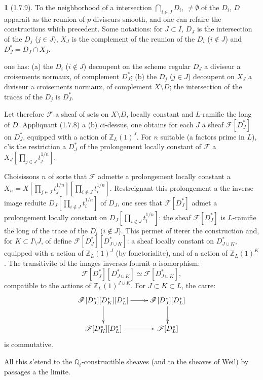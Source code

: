 \documentclass[12pt,a4paper]{article}
\theoremstyle{plain}
\theoremstyle{definition}
\theoremstyle{definition}
\newtheorem{para}{}[section]
\theoremstyle{remark}
\begin{document}
\begin{para}[1.7.9]
To the neighborhood of a intersection $\bigcap_{i \in J} D_i$, $\neq \emptyset$ of the $D_i$, $D$ apparait as the reunion of $p$ diviseurs smooth, and one can refaire the constructions which precedent. Some notations: for $J \subset I$, $D_J$ is the intersection of the $D_j$ ($j \in J$), $X_J$ is the complement of the reunion of the $D_i$ ($i \notin J$) and $D_J^* = D_J \cap X_J$.

one has: (a) the $D_i$ ($i \notin J$) decoupent on the scheme regular $D_J$ a diviseur a croisements normaux, of complement $D_J^*$; (b) the $D_j$ ($j \in J$) decoupent on $X_J$ a diviseur a croisements normaux, of complement $X \setminus D$; the intersection of the traces of the $D_j$ is $D_J^*$.

Let therefore $\mathscr{F}$ a sheaf of sets on $X \setminus D$, locally constant and $L$-ramifie the long of $D$. Appliquant (1.7.8) a (b) ci-dessus, one obtains for each $J$ a sheaf $\mathscr{F}[D_J^*]$ on $D_J^*$, equipped with a action of $\mathbb{Z}_L(1)^J$. For $n$ suitable (a factors prime in $L$), c'is the restriction a $D_J^*$ of the prolongement locally constant of $\mathscr{F}$ a $X_J[\prod_{j \in J} t_j^{1/n}]$.

Choisissons $n$ of sorte that $\mathscr{F}$ admette a prolongement locally constant a $X_n = X[\prod_{j \in J} t_j^{1/n}][\prod_{i \notin J} t_i^{1/n}]$. Restreignant this prolongement a the inverse image reduite $D_J[\prod_{i \notin J} t_i^{1/n}]$ of $D_J$, one sees that $\mathscr{F}[D_J^*]$ admet a prolongement locally constant on $D_J[\prod_{i \notin J} t_i^{1/n}]$: the sheaf $\mathscr{F}[D_J^*]$ is $L$-ramifie the long of the trace of the $D_i$ ($i \notin J$). This permet of iterer the construction and, for $K \subset I \setminus J$, of define $\mathscr{F}[D_J^*][D_{J \cup K}^*]$: a sheaf locally constant on $D_{J \cup K}^*$, equipped with a action of $\mathbb{Z}_L(1)^J$ (by fonctorialite), and of a action of $\mathbb{Z}_L(1)^K$. The transitivite of the images inverses fournit a isomorphism:
\begin{equation}\tag{1.7.9.1}
\mathscr{F}[D_J^*][D_{J \cup K}^*] \simeq \mathscr{F}[D_{J \cup K}^*],
\end{equation}
compatible to the actions of $\mathbb{Z}_L(1)^{J \cup K}$. For $J \subset K \subset L$, the carre:
\[\xymatrix{
\mathscr{F}[D_J^*][D_K^*][D_L^*] \ar[r] \ar[d] & \mathscr{F}[D_J^*][D_L^*] \ar[d] \\
\mathscr{F}[D_K^*][D_L^*] \ar[r] & \mathscr{F}[D_L^*]
}\]
is commutative.

All this s'etend to the $\overline{\mathbb{Q}}_\ell$-constructible sheaves (and to the sheaves of Weil) by passages a the limite.
\end{para}
\end{document}
